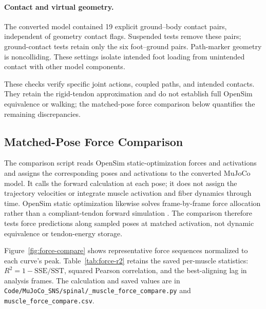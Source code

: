 \paragraph{Contact and virtual geometry.}
The converted model contained 19 explicit ground--body contact pairs, independent of geometry contact flags. Suspended tests remove these pairs; ground-contact tests retain only the six foot--ground pairs. Path-marker geometry is noncolliding. These settings isolate intended foot loading from unintended contact with other model components.

These checks verify specific joint actions, coupled paths, and intended contacts. They retain the rigid-tendon approximation and do not establish full OpenSim equivalence or walking; the matched-pose force comparison below quantifies the remaining discrepancies.


\subsection{Matched-Pose Force Comparison}
\label{sec:muscle-models-compare}

The comparison script reads OpenSim static-optimization forces and activations and assigns the corresponding poses and activations to the converted MuJoCo model. It calls the forward calculation at each pose; it does not assign the trajectory velocities or integrate muscle activation and fiber dynamics through time. OpenSim static optimization likewise solves frame-by-frame force allocation rather than a compliant-tendon forward simulation \citep{opensim_static_optimization_docs}. The comparison therefore tests force predictions along sampled poses at matched activation, not dynamic equivalence or tendon-energy storage.

Figure~\ref{fig:force-compare} shows representative force sequences normalized to each curve's peak. Table~\ref{tab:force-r2} retains the saved per-muscle statistics: $R^2=1-\mathrm{SSE}/\mathrm{SST}$, squared Pearson correlation, and the best-aligning lag in analysis frames. The calculation and saved values are in \nolinkurl{Code/MuJoCo_SNS/spinal/_muscle_force_compare.py} and \nolinkurl{muscle_force_compare.csv}.

